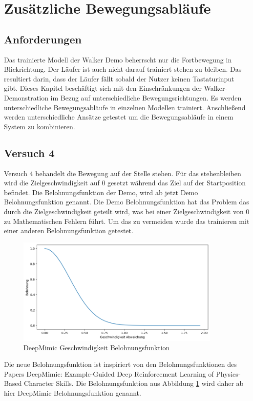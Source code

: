 \section{Zusätzliche Bewegungsabläufe}
\subsection{Anforderungen}
Das trainierte Modell der Walker Demo beherrscht nur die Fortbewegung in Blickrichtung. Der Läufer ist auch nicht darauf trainiert stehen zu bleiben. Das resultiert darin, dass der Läufer fällt sobald der Nutzer keinen Tastaturinput gibt. Dieses Kapitel beschäftigt sich mit den Einschränkungen der Walker-Demonstration im Bezug auf unterschiedliche Bewegungsrichtungen. Es werden unterschiedliche Bewegungsabläufe in einzelnen Modellen trainiert. Anschließend werden unterschiedliche Ansätze getestet um die Bewegungsabläufe in einem System zu kombinieren.

\subsection{Versuch 4}
\label{subsec:versuch4}
Versuch 4 behandelt die Bewegung auf der Stelle stehen. Für das stehenbleiben wird die Zielgeschwindigkeit auf 0 gesetzt während das Ziel auf der Startposition befindet. Die Belohnungsfunktion der Demo, wird ab jetzt Demo Belohnungsfunktion genannt. Die Demo Belohnungsfunktion hat das Problem das durch die Zielgeschwindigkeit geteilt wird, was bei einer Zielgeschwindigkeit von 0 zu Mathematischen Fehlern führt. Um das zu vermeiden wurde das trainieren mit einer anderen Belohnungsfunktion getestet.
\begin{figure}[H]
  \centering  
  \includegraphics[width=0.9\textwidth]{img/plot_deepmimic_vel}
  \caption{DeepMimic Geschwindigkeit Belohnungsfunktion}
  \label{fig:plot_deepmimic_vel}
\end{figure}
Die neue Belohnungsfunktion ist inspiriert von den Belohnungsfunktionen des Papers \grqq{}DeepMimic: Example-Guided Deep Reinforcement Learning of Physics-Based Character Skills\grqq{}.\cite{peng2018deepmimic}
Die Belohnungsfunktion aus Abbildung \ref{fig:plot_deepmimic_vel} wird daher ab hier DeepMimic Belohnungsfunktion genannt.

